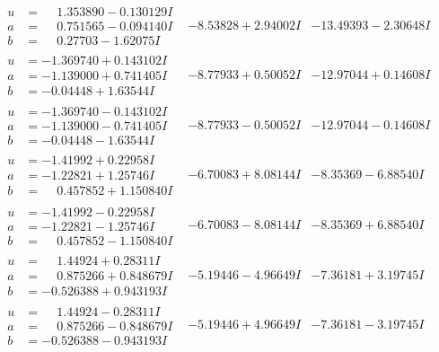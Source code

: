 \documentclass[1p]{elsarticle_modified}
\theoremstyle{definition}
\begin{document}
$$\begin{array}{c|c|c}
\begin{aligned}
u &= \phantom{-}1.353890 - 0.130129 I \\
a &= \phantom{-}0.751565 - 0.094140 I \\
b &= \phantom{-}0.27703 - 1.62075 I\end{aligned}
 & -8.53828 + 2.94002 I & -13.49393 - 2.30648 I \\ \hline\begin{aligned}
u &= -1.369740 + 0.143102 I \\
a &= -1.139000 + 0.741405 I \\
b &= -0.04448 + 1.63544 I\end{aligned}
 & -8.77933 + 0.50052 I & -12.97044 + 0.14608 I \\ \hline\begin{aligned}
u &= -1.369740 - 0.143102 I \\
a &= -1.139000 - 0.741405 I \\
b &= -0.04448 - 1.63544 I\end{aligned}
 & -8.77933 - 0.50052 I & -12.97044 - 0.14608 I \\ \hline\begin{aligned}
u &= -1.41992 + 0.22958 I \\
a &= -1.22821 + 1.25746 I \\
b &= \phantom{-}0.457852 + 1.150840 I\end{aligned}
 & -6.70083 + 8.08144 I & -8.35369 - 6.88540 I \\ \hline\begin{aligned}
u &= -1.41992 - 0.22958 I \\
a &= -1.22821 - 1.25746 I \\
b &= \phantom{-}0.457852 - 1.150840 I\end{aligned}
 & -6.70083 - 8.08144 I & -8.35369 + 6.88540 I \\ \hline\begin{aligned}
u &= \phantom{-}1.44924 + 0.28311 I \\
a &= \phantom{-}0.875266 + 0.848679 I \\
b &= -0.526388 + 0.943193 I\end{aligned}
 & -5.19446 - 4.96649 I & -7.36181 + 3.19745 I \\ \hline\begin{aligned}
u &= \phantom{-}1.44924 - 0.28311 I \\
a &= \phantom{-}0.875266 - 0.848679 I \\
b &= -0.526388 - 0.943193 I\end{aligned}
 & -5.19446 + 4.96649 I & -7.36181 - 3.19745 I \\ \hline\begin{aligned}

\end{aligned}
\end{array}$$
\end{document}
